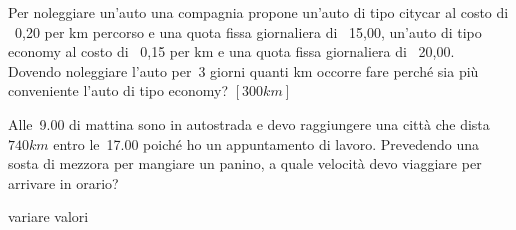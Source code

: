 {{{{\begin{multicols}{2}
 \begin{esercizio}[\Ast]
 \label{ese:21.26}
 Per noleggiare un'auto una compagnia propone
un'auto di tipo citycar al costo di \officialeuro\ 0,20 per km percorso e una 
quota fissa giornaliera
di \officialeuro\ 15,00,
un'auto di tipo economy al costo di \officialeuro\ 0,15
per km e una quota fissa giornaliera di \officialeuro\ 20,00. Dovendo
noleggiare l'auto per~3 giorni quanti km occorre fare
perché sia più conveniente l'auto di tipo economy?
 \hfill \(\left[300\unit{km}\right]\)
 \end{esercizio}

 \begin{esercizio}
 \label{ese:21.27}
 Alle~9.00 di mattina sono in autostrada e devo raggiungere una città
che dista~\(740\unit{km}\) entro le~17.00 poiché ho un appuntamento di lavoro.
Prevedendo una sosta di mezzora per mangiare un panino, a quale
velocità devo viaggiare per arrivare in orario?
 \end{esercizio}


variare 
% 
% 
valori


\end{multicols}}}}}
